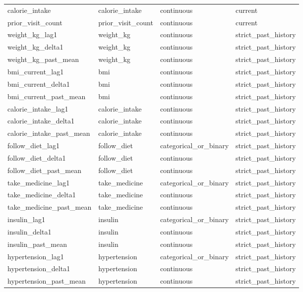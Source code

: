 \begin{longtable}{llll}
calorie\_intake & calorie\_intake & continuous & current \\
prior\_visit\_count & prior\_visit\_count & continuous & current \\
weight\_kg\_lag1 & weight\_kg & continuous & strict\_past\_history \\
weight\_kg\_delta1 & weight\_kg & continuous & strict\_past\_history \\
weight\_kg\_past\_mean & weight\_kg & continuous & strict\_past\_history \\
bmi\_current\_lag1 & bmi & continuous & strict\_past\_history \\
bmi\_current\_delta1 & bmi & continuous & strict\_past\_history \\
bmi\_current\_past\_mean & bmi & continuous & strict\_past\_history \\
calorie\_intake\_lag1 & calorie\_intake & continuous & strict\_past\_history \\
calorie\_intake\_delta1 & calorie\_intake & continuous & strict\_past\_history \\
calorie\_intake\_past\_mean & calorie\_intake & continuous & strict\_past\_history \\
follow\_diet\_lag1 & follow\_diet & categorical\_or\_binary & strict\_past\_history \\
follow\_diet\_delta1 & follow\_diet & continuous & strict\_past\_history \\
follow\_diet\_past\_mean & follow\_diet & continuous & strict\_past\_history \\
take\_medicine\_lag1 & take\_medicine & categorical\_or\_binary & strict\_past\_history \\
take\_medicine\_delta1 & take\_medicine & continuous & strict\_past\_history \\
take\_medicine\_past\_mean & take\_medicine & continuous & strict\_past\_history \\
insulin\_lag1 & insulin & categorical\_or\_binary & strict\_past\_history \\
insulin\_delta1 & insulin & continuous & strict\_past\_history \\
insulin\_past\_mean & insulin & continuous & strict\_past\_history \\
hypertension\_lag1 & hypertension & categorical\_or\_binary & strict\_past\_history \\
hypertension\_delta1 & hypertension & continuous & strict\_past\_history \\
hypertension\_past\_mean & hypertension & continuous & strict\_past\_history \\

\end{longtable}
